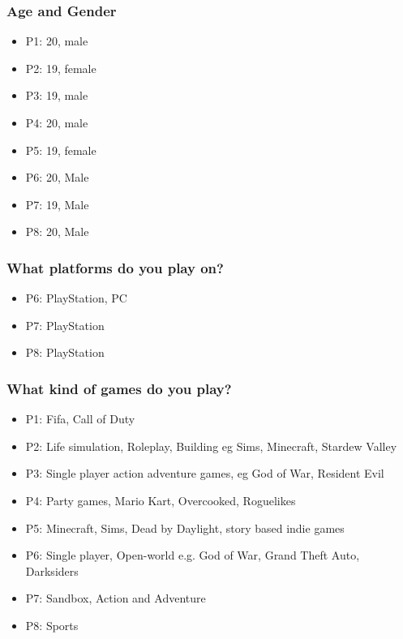 \documentclass{article}
\begin{document}
\subsubsection*{Age and Gender}
\begin{itemize}
	\item P1: 20, male
	\item P2: 19, female
	\item P3: 19, male
	\item P4: 20, male
	\item P5: 19, female
	\item P6: 20, Male
	\item P7: 19, Male
	\item P8: 20, Male
\end{itemize}

\subsubsection*{What platforms do you play on?}
\begin{itemize}
	\item P6: PlayStation, PC
	\item P7: PlayStation
	\item P8: PlayStation
\end{itemize}

\subsubsection*{What kind of games do you play?}
\begin{itemize}
	\item P1: Fifa, Call of Duty
	\item P2: Life simulation, Roleplay, Building eg Sims, Minecraft, Stardew Valley
	\item P3: Single player action adventure games, eg God of War, Resident Evil
	\item P4: Party games, Mario Kart, Overcooked, Roguelikes
	\item P5: Minecraft, Sims, Dead by Daylight, story based indie games
	\item P6: Single player, Open-world e.g. God of War, Grand Theft Auto, Darksiders
	\item P7: Sandbox, Action and Adventure
	\item P8: Sports
\end{itemize}
\end{document}

